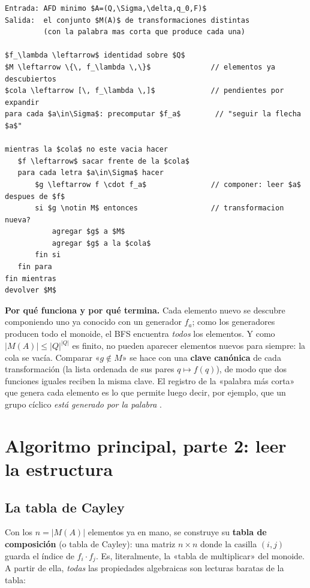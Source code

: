 \documentclass[11pt,a4paper]{article}
\theoremstyle{acc}
\newcommand{\code}[1]{{\ttfamily #1}}
\begin{document}
\begin{lstlisting}[style=algo,caption={},captionpos=b]
Entrada: AFD minimo $A=(Q,\Sigma,\delta,q_0,F)$
Salida:  el conjunto $M(A)$ de transformaciones distintas
         (con la palabra mas corta que produce cada una)

$f_\lambda \leftarrow$ identidad sobre $Q$
$M \leftarrow \{\, f_\lambda \,\}$              // elementos ya descubiertos
$cola \leftarrow [\, f_\lambda \,]$             // pendientes por expandir
para cada $a\in\Sigma$: precomputar $f_a$        // "seguir la flecha $a$"

mientras la $cola$ no este vacia hacer
   $f \leftarrow$ sacar frente de la $cola$
   para cada letra $a\in\Sigma$ hacer
       $g \leftarrow f \cdot f_a$               // componer: leer $a$ despues de $f$
       si $g \notin M$ entonces                 // transformacion nueva?
           agregar $g$ a $M$
           agregar $g$ a la $cola$
       fin si
   fin para
fin mientras
devolver $M$
\end{lstlisting}

\noindent\textbf{Por qué funciona y por qué termina.}
Cada elemento nuevo se descubre componiendo uno ya conocido con un generador
$f_a$; como los generadores producen todo el monoide, el BFS encuentra
\emph{todos} los elementos. Y como $|M(A)|\le |Q|^{|Q|}$ es finito, no pueden
aparecer elementos nuevos para siempre: la cola se vacía. Comparar «$g\notin M$»
se hace con una \textbf{clave canónica} de cada transformación (la lista
ordenada de sus pares $q\mapsto f(q)$), de modo que dos funciones iguales
reciben la misma clave. El registro de la «palabra más corta» que genera cada
elemento es lo que permite luego decir, por ejemplo, que un grupo cíclico
\emph{está generado por la palabra} \code{1}.

\section{Algoritmo principal, parte 2: leer la estructura}\label{sec:an}

\subsection{La tabla de Cayley}
Con los $n=|M(A)|$ elementos ya en mano, se construye su \textbf{tabla de
composición} (o tabla de Cayley): una matriz $n\times n$ donde la casilla
$(i,j)$ guarda el índice de $f_i\cdot f_j$. Es, literalmente, la «tabla de
multiplicar» del monoide. A partir de ella, \emph{todas} las propiedades
algebraicas son lecturas baratas de la tabla:
\end{document}

